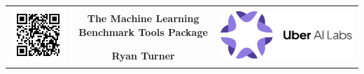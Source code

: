 \documentclass[a0,landscape]{a0poster}
\begin{document}


{
\setlength\extrarowheight{35pt}
\begin{tabular}{P{15cm}cP{15cm}}
&
{\fontsize{100}{120} \selectfont \color{NavyBlue} \textbf{The Machine Learning Benchmark Tools Package} \color{Black}}
&
 \\
&
\Huge \textbf{Ryan Turner}
&
\end{tabular}
}

\vspace{7mm} %

\end{document}
